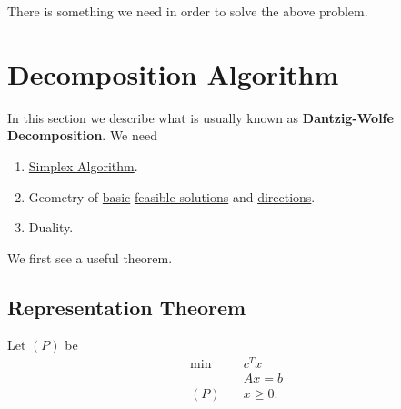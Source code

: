 There is something we need in order to solve the above problem.

\section{Decomposition Algorithm}
In this section we describe what is usually known as \textbf{Dantzig-Wolfe Decomposition}. We need
\begin{enumerate}
	\item \hyperref[algo:simplex-algorithm]{Simplex Algorithm}.
	\item Geometry of \hyperref[def:basic-solution]{basic} \hyperref[def:feasible-solution]{feasible solutions} and \hyperref[def:basic-direction]{directions}.
	\item Duality.
\end{enumerate}

We first see a useful theorem.
\subsection{Representation Theorem}
Let \((P)\) be
\begin{align*}
	\min~    & c^Tx     \\
	         & Ax = b   \\
	(P)\quad & x\geq 0.
\end{align*}


